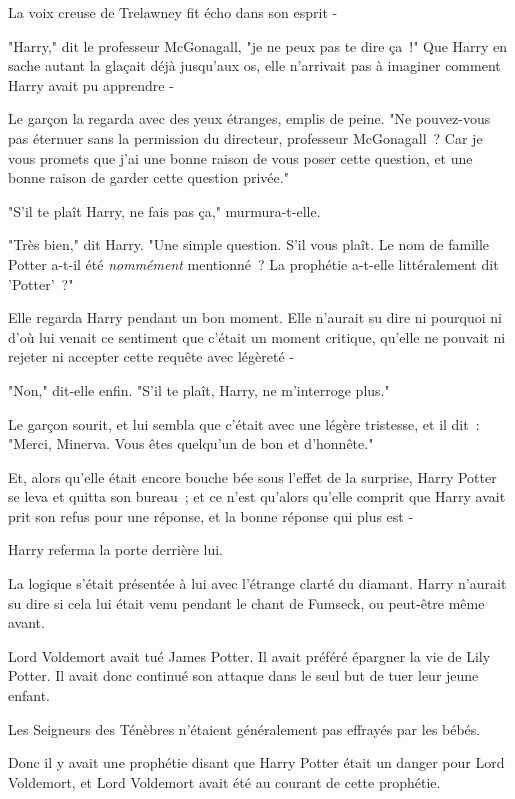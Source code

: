La voix creuse de Trelawney fit écho dans son esprit -

"Harry," dit le professeur McGonagall, "je ne peux pas te dire ça~!" Que Harry en sache autant la glaçait déjà jusqu'aux os, elle n'arrivait pas à imaginer comment Harry avait pu apprendre -

Le garçon la regarda avec des yeux étranges, emplis de peine. "Ne pouvez-vous pas éternuer sans la permission du directeur, professeur McGonagall~? Car je vous promets que j'ai une bonne raison de vous poser cette question, et une bonne raison de garder cette question privée."

"S'il te plaît Harry, ne fais pas ça," murmura-t-elle.

"Très bien," dit Harry. "Une simple question. S'il vous plaît. Le nom de famille Potter a-t-il été \emph{nommément} mentionné~? La prophétie a-t-elle littéralement dit 'Potter'~?"

Elle regarda Harry pendant un bon moment. Elle n'aurait su dire ni pourquoi ni d'où lui venait ce sentiment que c'était un moment critique, qu'elle ne pouvait ni rejeter ni accepter cette requête avec légèreté -

"Non," dit-elle enfin. "S'il te plaît, Harry, ne m'interroge plus."

Le garçon sourit, et lui sembla que c'était avec une légère tristesse, et il dit~: "Merci, Minerva. Vous êtes quelqu'un de bon et d'honnête."

Et, alors qu'elle était encore bouche bée sous l'effet de la surprise, Harry Potter se leva et quitta son bureau~; et ce n'est qu'alors qu'elle comprit que Harry avait prit son refus pour une réponse, et la bonne réponse qui plus est -

Harry referma la porte derrière lui.

La logique s'était présentée à lui avec l'étrange clarté du diamant. Harry n'aurait su dire si cela lui était venu pendant le chant de Fumseck, ou peut-être même avant.

Lord Voldemort avait tué James Potter. Il avait préféré épargner la vie de Lily Potter. Il avait donc continué son attaque dans le seul but de tuer leur jeune enfant.

Les Seigneurs des Ténèbres n'étaient généralement pas effrayés par les bébés.

Donc il y avait une prophétie disant que Harry Potter était un danger pour Lord Voldemort, et Lord Voldemort avait été au courant de cette prophétie.

